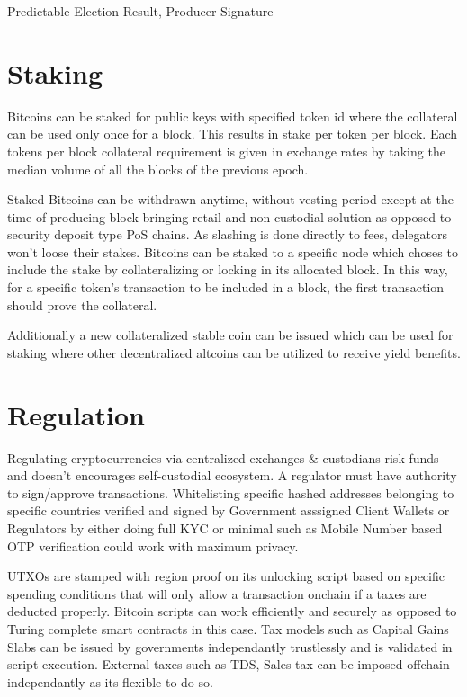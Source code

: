 \documentclass[a4paper,10pt]{article}
\begin{document}
Predictable Election Result, Producer Signature


\section{Staking}

Bitcoins can be staked for public keys with specified token id where the collateral can be used only once for a block. This results in stake per token per block. Each tokens per block collateral requirement is given in exchange rates by taking the median volume of all the blocks of the previous epoch.

Staked Bitcoins can be withdrawn anytime, without vesting period except at the time of producing block bringing retail and non-custodial solution as opposed to security deposit type PoS chains. As slashing is done directly to fees, delegators won't loose their stakes. Bitcoins can be staked to a specific node which choses to include the stake by collateralizing or locking in its allocated block. In this way, for a specific token's transaction to be included in a block, the first transaction should prove the collateral.

 Additionally a new collateralized stable coin can be issued which can be used for staking where other decentralized altcoins can be utilized to receive yield benefits. 

\section{Regulation}
Regulating cryptocurrencies via centralized exchanges \& custodians risk funds and doesn't encourages self-custodial ecosystem. A regulator must have authority to sign/approve transactions. Whitelisting specific hashed addresses belonging to specific countries verified and signed by Government asssigned Client Wallets or Regulators by either doing full KYC or minimal such as Mobile Number based OTP verification could work with maximum privacy. 

UTXOs are stamped with region proof on its unlocking script based on specific spending conditions that will only allow a transaction onchain if a taxes are deducted properly. Bitcoin scripts can work efficiently and securely as opposed to Turing complete smart contracts in this case. Tax models such as Capital Gains Slabs can be issued by governments independantly trustlessly and is validated in script execution. External taxes such as TDS, Sales tax can be imposed offchain independantly as its flexible to do so.
\end{document}
